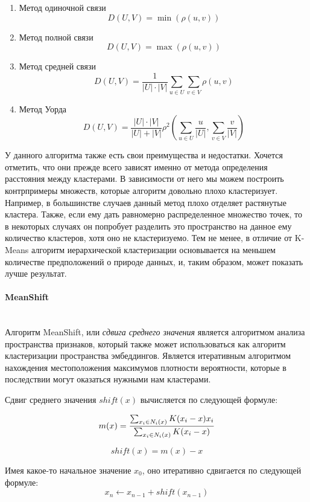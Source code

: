 \begin{enumerate}
    \item Метод одиночной связи $$D(U, V) = \min(\rho(u, v))$$
    \item Метод полной связи $$D(U, V) = \max(\rho(u, v))$$
    \item Метод средней связи $$D(U, V) = \frac{1}{|U| \cdot |V|}\sum_{u \in U} \sum_{v \in V} \rho(u, v)$$
    \item Метод Уорда $$D(U, V) = \frac{|U| \cdot |V|}{|U| + |V|} \rho^2 \left( \sum_{u \in U} \frac{u}{|U|}, \sum_{v \in V} \frac{v}{|V|} \right)$$
\end{enumerate}

У данного алгоритма также есть свои преимущества и недостатки. Хочется отметить, что они прежде всего зависят именно от метода определения расстояния между кластерами. В зависимости от него мы можем построить контрпримеры множеств, которые алгоритм довольно плохо кластеризует. Например, в большинстве случаев данный метод плохо отделяет растянутые кластера.
Также, если ему дать равномерно распределенное множество точек, то в некоторых случаях он попробует разделить это пространство на данное ему количество кластеров, хотя оно не кластеризуемо. Тем не менее, в отличие от K-Means алгоритм иерархической кластеризации основывается на меньшем количестве предположений о природе данных, и, таким образом, может показать лучше результат.

\paragraph{MeanShift}\mbox{} \\

Алгоритм MeanShift, или \textit{сдвига среднего значения} является алгоритмом анализа пространства признаков, который также может использоваться как алгоритм кластеризации пространства эмбеддингов. Является итеративным алгоритмом нахождения местоположения максимумов плотности вероятности, которые в последствии могут оказаться нужными нам кластерами. 

Сдвиг среднего значения $shift(x)$ вычисляется по следующей формуле:

$$
m(x) = \frac{\sum_{x_i \in N_i(x)} K(x_i - x)x_i}{\sum_{x_i \in N_i(x)} K(x_i - x)}\\
$$

$$
shift(x) = m(x) - x
$$

\noindent
Имея какое-то начальное значение $x_0$, оно итеративно сдвигается по следующей формуле:
$$
x_n \leftarrow x_{n - 1} + shift(x_{n - 1})
$$

